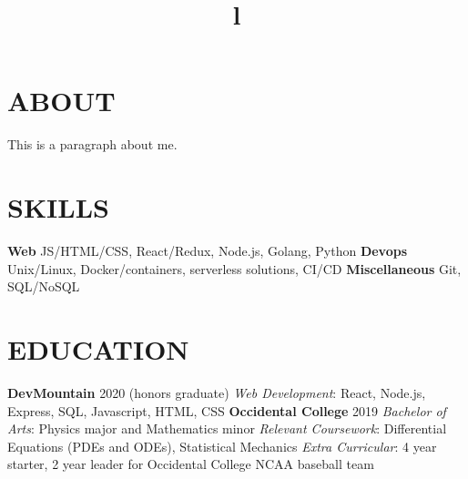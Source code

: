 \documentclass[margin]{res}
\begin{document}
\begin{resume}


\section{ABOUT}
This is a paragraph about me.

\section{SKILLS}

\textbf{Web} JS/HTML/CSS, React/Redux, Node.js, Golang, Python\newline
\textbf{Devops} Unix/Linux, Docker/containers, serverless solutions, CI/CD\newline
\textbf{Miscellaneous} Git, SQL/NoSQL

\section{EDUCATION}
\textbf{DevMountain} 2020 (honors graduate)\newline
{\sl Web Development}: React, Node.js, Express, SQL, Javascript, HTML, CSS\newline
\textbf{Occidental College} 2019\newline
{\sl Bachelor of Arts}: Physics major and Mathematics minor\newline
{\sl Relevant Coursework}: Differential Equations (PDEs and ODEs), Statistical Mechanics\newline
{\sl Extra Curricular}: 4 year starter, 2 year leader for Occidental College NCAA baseball team


\begin{format}
\title{l}\\
\\
\body\\
\end{format}


\end{resume}
\end{document}
